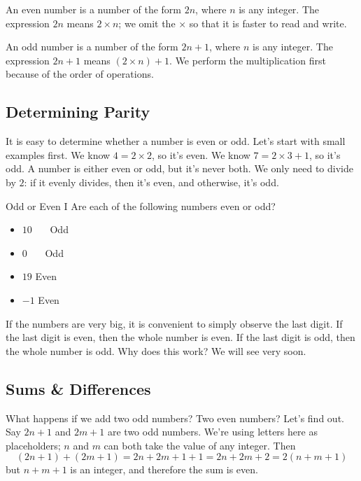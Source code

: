 \documentclass[a4paper,10pt]{report}
\begin{document}
An even number is a number of the form \(2n\), where \(n\) is any integer. The
expression \(2n\) means \(2\times n\); we omit the \(\times\) so that it is
faster to read and write.

An odd number is a number of the form \(2n+1\), where \(n\) is any integer. The
expression \(2n+1\) means \((2\times n) + 1\). We perform the multiplication
first because of the order of operations.

\subsection{Determining Parity}

It is easy to determine whether a number is even or odd. Let's start with small
examples first. We know \(4=2\times2\), so it's even. We know \(7=2\times3+1\),
so it's odd. A number is either even or odd, but it's never both. We only need
to divide by \(2\): if it evenly divides, then it's even, and otherwise, it's
odd.

\begin{problem}{Odd or Even I}
 Are each of the following numbers even or odd?

 \begin{itemize}
  \item \(10\) \hfill {}~~~Odd
  \item \(0\) \hfill {}~~~Odd
  \item \(19\) \hfill Even~~~
  \item \(-1\) \hfill Even~~~
 \end{itemize}
\end{problem}

If the numbers are very big, it is convenient to simply observe the last digit.
If the last digit is even, then the whole number is even. If the last digit is
odd, then the whole number is odd. Why does this work? We will see very soon.

\subsection{Sums \& Differences}

What happens if we add two odd numbers? Two even numbers? Let's find out. Say
\(2n+1\) and \(2m+1\) are two odd numbers. We're using letters here as
placeholders; \(n\) and \(m\) can both take the value of any integer. Then \[
(2n+1) + (2m+1) = 2n + 2m + 1 + 1 = 2n + 2m + 2 = 2(n+m+1) \] but \(n+m+1\) is
an integer, and therefore the sum is even.
\end{document}
